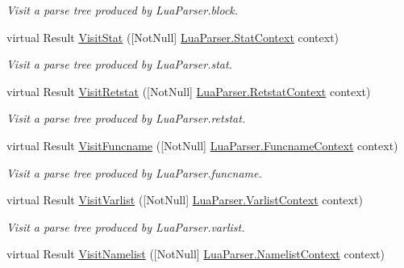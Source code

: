 \begin{DoxyCompactItemize}
\begin{DoxyCompactList}\small\item\em Visit a parse tree produced by Lua\+Parser.\+block. \end{DoxyCompactList}\item 
virtual Result \mbox{\hyperlink{classzlua_1_1_lua_base_visitor_a64a5b6fe7b4450d97a48968ddbc02a23}{Visit\+Stat}} (\mbox{[}Not\+Null\mbox{]} \mbox{\hyperlink{classzlua_1_1_lua_parser_1_1_stat_context}{Lua\+Parser.\+Stat\+Context}} context)
\begin{DoxyCompactList}\small\item\em Visit a parse tree produced by Lua\+Parser.\+stat. \end{DoxyCompactList}\item 
virtual Result \mbox{\hyperlink{classzlua_1_1_lua_base_visitor_ab7354e58a007e8352ef5be6a0f31a3ad}{Visit\+Retstat}} (\mbox{[}Not\+Null\mbox{]} \mbox{\hyperlink{classzlua_1_1_lua_parser_1_1_retstat_context}{Lua\+Parser.\+Retstat\+Context}} context)
\begin{DoxyCompactList}\small\item\em Visit a parse tree produced by Lua\+Parser.\+retstat. \end{DoxyCompactList}\item 
virtual Result \mbox{\hyperlink{classzlua_1_1_lua_base_visitor_a07e2a1501c3a324becaaa42633bb7dbf}{Visit\+Funcname}} (\mbox{[}Not\+Null\mbox{]} \mbox{\hyperlink{classzlua_1_1_lua_parser_1_1_funcname_context}{Lua\+Parser.\+Funcname\+Context}} context)
\begin{DoxyCompactList}\small\item\em Visit a parse tree produced by Lua\+Parser.\+funcname. \end{DoxyCompactList}\item 
virtual Result \mbox{\hyperlink{classzlua_1_1_lua_base_visitor_a0afd36a66f579f1e86113881d8e8c78e}{Visit\+Varlist}} (\mbox{[}Not\+Null\mbox{]} \mbox{\hyperlink{classzlua_1_1_lua_parser_1_1_varlist_context}{Lua\+Parser.\+Varlist\+Context}} context)
\begin{DoxyCompactList}\small\item\em Visit a parse tree produced by Lua\+Parser.\+varlist. \end{DoxyCompactList}\item 
virtual Result \mbox{\hyperlink{classzlua_1_1_lua_base_visitor_ac7d5334db78b99d1733e979269f5ad9a}{Visit\+Namelist}} (\mbox{[}Not\+Null\mbox{]} \mbox{\hyperlink{classzlua_1_1_lua_parser_1_1_namelist_context}{Lua\+Parser.\+Namelist\+Context}} context)

\end{DoxyCompactItemize}
